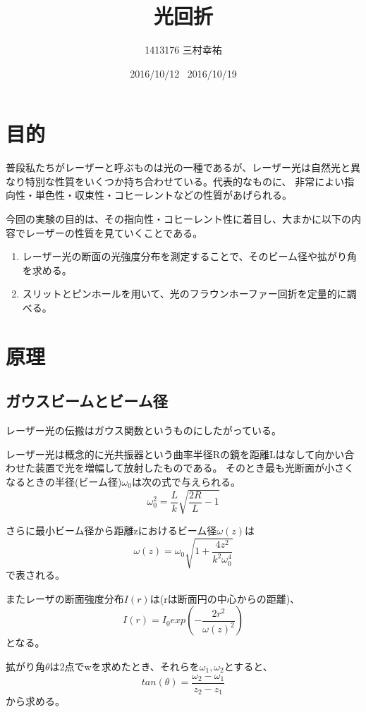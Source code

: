 \documentclass[11pt,a4j]{jsarticle}
\title{光回折}
\author{1413176 三村幸祐}
\date{2016/10/12 \, 2016/10/19}
\begin{document}
  
  
 \section{目的}
  普段私たちがレーザーと呼ぶものは光の一種であるが、レーザー光は自然光と異なり特別な性質をいくつか持ち合わせている。代表的なものに、
  非常によい指向性・単色性・収束性・コヒーレントなどの性質があげられる。
  
  今回の実験の目的は、その指向性・コヒーレント性に着目し、大まかに以下の内容でレーザーの性質を見ていくことである。
  \begin{enumerate}
   \item レーザー光の断面の光強度分布を測定することで、そのビーム径や拡がり角を求める。
   \item スリットとピンホールを用いて、光のフラウンホーファー回折を定量的に調べる。
  \end{enumerate}

  
  
 \section{原理}
  \subsection{ガウスビームとビーム径}
  レーザー光の伝搬はガウス関数というものにしたがっている。
  
  レーザー光は概念的に光共振器という曲率半径Rの鏡を距離Lはなして向かい合わせた装置で光を増幅して放射したものである。
  そのとき最も光断面が小さくなるときの半径(ビーム径)$\omega_0$は次の式で与えられる。
  \begin{equation}
   \omega_0^2 = \frac{L}{k} \sqrt{\frac{2R}{L} - 1}
  \end{equation}
  
  さらに最小ビーム径から距離zにおけるビーム径$\omega(z)$は
  \begin{equation}
   \omega(z) = \omega_0 \sqrt{1+ \frac{4z^2}{k^2 \omega_0^4}}
  \end{equation}
  で表される。
  
  またレーザの断面強度分布$I(r)$は(rは断面円の中心からの距離)、
  \begin{equation}
   I(r) =  I_0 exp(-\frac{2r^2}{\omega(z)^2})
  \end{equation}
  となる。
  
  拡がり角$\theta$は2点でwを求めたとき、それらを$\omega_1,\omega_2$とすると、
  \begin{equation}
   tan(\theta) = \frac{\omega_2 - \omega_1}{z_2 - z_1}
  \end{equation}
  から求める。
  
\end{document}
